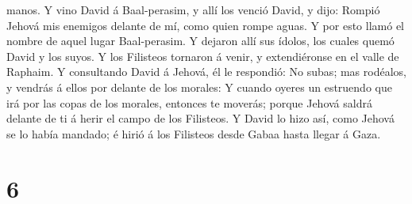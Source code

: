 manos.  Y vino David á Baal-perasim, y allí los venció
David, y dijo: Rompió Jehová mis enemigos delante de mí, como quien
rompe aguas. Y por esto llamó el nombre de aquel lugar Baal-perasim.
 Y dejaron allí sus ídolos, los cuales quemó David y los
suyos.  Y los Filisteos tornaron á venir, y extendiéronse
en el valle de Raphaim.  Y consultando David á Jehová, él
le respondió: No subas; mas rodéalos, y vendrás á ellos por delante de
los morales:  Y cuando oyeres un estruendo que irá por
las copas de los morales, entonces te moverás; porque Jehová saldrá
delante de ti á herir el campo de los Filisteos.  Y David
lo hizo así, como Jehová se lo había mandado; é hirió á los Filisteos
desde Gabaa hasta llegar á Gaza.

\hypertarget{section-5}{%
\section{6}\label{section-5}}

